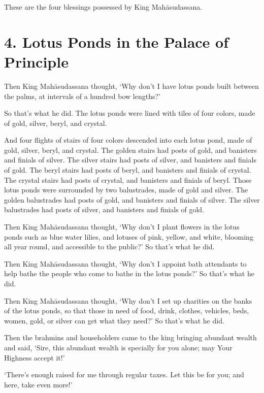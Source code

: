 \documentclass[12pt,openany]{book}%
\begin{document}
These are the four blessings possessed by King \textsanskrit{Mahāsudassana}. 

\section*{4. Lotus Ponds in the Palace of Principle }

Then King \textsanskrit{Mahāsudassana} thought, ‘Why don’t I have lotus ponds built between the palms, at intervals of a hundred bow lengths?’ 

So that’s what he did. The lotus ponds were lined with tiles of four colors, made of gold, silver, beryl, and crystal. 

And four flights of stairs of four colors descended into each lotus pond, made of gold, silver, beryl, and crystal. The golden stairs had posts of gold, and banisters and finials of silver. The silver stairs had posts of silver, and banisters and finials of gold. The beryl stairs had posts of beryl, and banisters and finials of crystal. The crystal stairs had posts of crystal, and banisters and finials of beryl. Those lotus ponds were surrounded by two balustrades, made of gold and silver. The golden balustrades had posts of gold, and banisters and finials of silver. The silver balustrades had posts of silver, and banisters and finials of gold. 

Then King \textsanskrit{Mahāsudassana} thought, ‘Why don’t I plant flowers in the lotus ponds such as blue water lilies, and lotuses of pink, yellow, and white, blooming all year round, and accessible to the public?’ So that’s what he did. 

Then King \textsanskrit{Mahāsudassana} thought, ‘Why don’t I appoint bath attendants to help bathe the people who come to bathe in the lotus ponds?’ So that’s what he did. 

Then King \textsanskrit{Mahāsudassana} thought, ‘Why don’t I set up charities on the banks of the lotus ponds, so that those in need of food, drink, clothes, vehicles, beds, women, gold, or silver can get what they need?’ So that’s what he did. 

Then the brahmins and householders came to the king bringing abundant wealth and said, ‘Sire, this abundant wealth is specially for you alone; may Your Highness accept it!’ 

‘There’s enough raised for me through regular taxes. Let this be for you; and here, take even more!’ 
\end{document}
